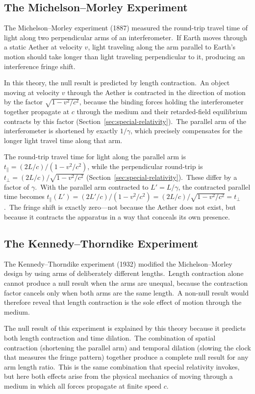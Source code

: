 ﻿\documentclass[12pt,letterpaper]{article}
\begin{document}
\subsection{The Michelson--Morley Experiment}

The Michelson--Morley experiment \cite{michelson1887} (1887) measured the round-trip travel time of light along
two perpendicular arms of an interferometer.\ If Earth moves through a static Aether at
velocity $v$, light traveling along the arm parallel to Earth's motion should take longer
than light traveling perpendicular to it, producing an interference fringe shift.

In this theory, the null result is predicted by length contraction.\ An object moving at
velocity $v$ through the Aether is contracted in the direction of motion by the factor
$\sqrt{1 - v^2/c^2}$, because the binding forces holding the interferometer together
propagate at $c$ through the medium and their retarded-field equilibrium contracts by
this factor (Section~\ref{sec:special-relativity}).\ The parallel arm of the
interferometer is shortened by exactly $1/\gamma$, which precisely compensates for the
longer light travel time along that arm.

The round-trip travel time for light along the parallel arm is
$t_{\parallel} = (2L/c)/(1 - v^2/c^2)$, while the perpendicular round-trip
is $t_{\perp} = (2L/c)/\sqrt{1 - v^2/c^2}$ (Section~\ref{sec:special-relativity}).\
These differ by a factor of $\gamma$.\ With the parallel arm contracted to
$L' = L/\gamma$, the contracted parallel time becomes
$t_{\parallel}(L') = (2L'/c)/(1 - v^2/c^2) = (2L/c)/\sqrt{1 - v^2/c^2}
= t_{\perp}$.\ The fringe shift is exactly zero---not because the Aether
does not exist, but because it contracts the apparatus in a way that
conceals its own presence.


\subsection{The Kennedy--Thorndike Experiment}

The Kennedy--Thorndike experiment \cite{kennedy1932} (1932) modified the Michelson--Morley design by using
arms of deliberately different lengths.\ Length contraction alone cannot produce a null
result when the arms are unequal, because the contraction factor cancels only when both
arms are the same length.\ A non-null result would therefore reveal that length contraction
is the sole effect of motion through the medium.

The null result of this experiment is explained by this theory because it predicts both
length contraction and time dilation.\ The combination of spatial contraction (shortening
the parallel arm) and temporal dilation (slowing the clock that measures the fringe
pattern) together produce a complete null result for any arm length ratio.\ This is the
same combination that special relativity invokes, but here both effects arise from the
physical mechanics of moving through a medium in which all forces propagate at
finite speed $c$.
\end{document}
